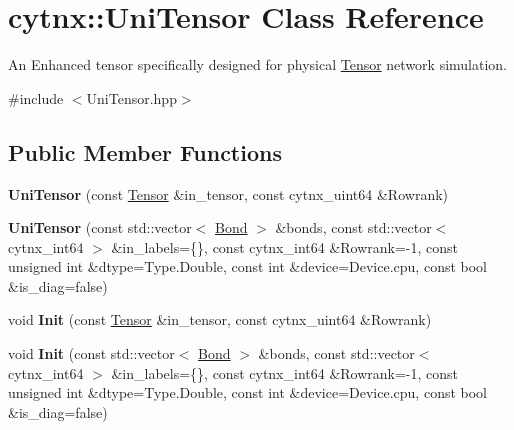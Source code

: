 \hypertarget{classcytnx_1_1UniTensor}{}\section{cytnx\+:\+:Uni\+Tensor Class Reference}
\label{classcytnx_1_1UniTensor}


An Enhanced tensor specifically designed for physical \hyperlink{classcytnx_1_1Tensor}{Tensor} network simulation.  




{\ttfamily \#include $<$Uni\+Tensor.\+hpp$>$}

\subsection*{Public Member Functions}
\begin{DoxyCompactItemize}
\item 
\mbox{\label{classcytnx_1_1UniTensor_a7a5b9286ae4bc1ef5afa00105f222a13}} 
{\bfseries Uni\+Tensor} (const \hyperlink{classcytnx_1_1Tensor}{Tensor} \&in\+\_\+tensor, const cytnx\+\_\+uint64 \&Rowrank)
\item 
\mbox{\label{classcytnx_1_1UniTensor_acc305e7b7767843bd282a9c2cc49114c}} 
{\bfseries Uni\+Tensor} (const std\+::vector$<$ \hyperlink{classcytnx_1_1Bond}{Bond} $>$ \&bonds, const std\+::vector$<$ cytnx\+\_\+int64 $>$ \&in\+\_\+labels=\{\}, const cytnx\+\_\+int64 \&Rowrank=-\/1, const unsigned int \&dtype=Type.\+Double, const int \&device=Device.\+cpu, const bool \&is\+\_\+diag=false)
\item 
\mbox{\label{classcytnx_1_1UniTensor_ae94c74dc715d1ed3aa409a894d4dddfb}} 
void {\bfseries Init} (const \hyperlink{classcytnx_1_1Tensor}{Tensor} \&in\+\_\+tensor, const cytnx\+\_\+uint64 \&Rowrank)
\item 
\mbox{\label{classcytnx_1_1UniTensor_ad6ba5c7452b4d83bfbaa9770060f8a63}} 
void {\bfseries Init} (const std\+::vector$<$ \hyperlink{classcytnx_1_1Bond}{Bond} $>$ \&bonds, const std\+::vector$<$ cytnx\+\_\+int64 $>$ \&in\+\_\+labels=\{\}, const cytnx\+\_\+int64 \&Rowrank=-\/1, const unsigned int \&dtype=Type.\+Double, const int \&device=Device.\+cpu, const bool \&is\+\_\+diag=false)
\item 

\end{DoxyCompactItemize}
